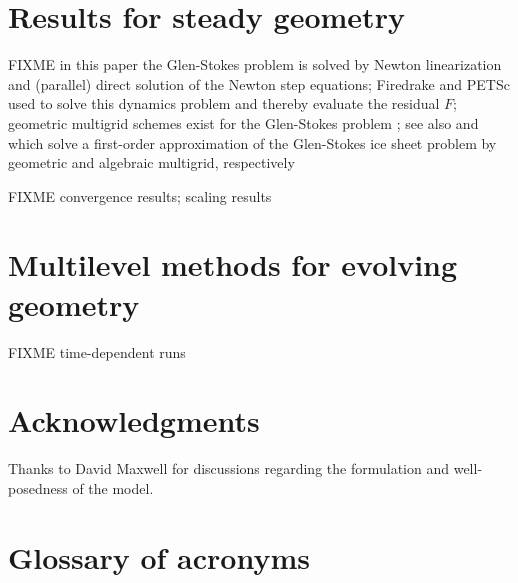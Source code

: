 \documentclass[letterpaper,final,12pt,reqno]{amsart}
\theoremstyle{claim}
\numberwithin{equation}{section}
\numberwithin{figure}{section}
\numberwithin{table}{section}
\numberwithin{theorem}{section}
\begin{document}
\section{Results for steady geometry} \label{sec:results}

FIXME in this paper the Glen-Stokes problem is solved by Newton linearization and (parallel) direct solution of the Newton step equations; Firedrake and PETSc \cite{Balayetal2020,Bueler2021} used to solve this dynamics problem and thereby evaluate the residual $F$; geometric multigrid schemes exist for the  Glen-Stokes problem \cite{IsaacStadlerGhattas2015}; see also \cite{BrownSmithAhmadia2013} and \cite{Tuminaroetal2016} which solve a first-order approximation of the Glen-Stokes ice sheet problem by geometric and algebraic multigrid, respectively

FIXME convergence results; scaling results


\section{Multilevel methods for evolving geometry} \label{sec:evolution}

FIXME time-dependent runs


\section*{Acknowledgments}  Thanks to David Maxwell for discussions regarding the formulation and well-posedness of the model.

\small

\bigskip



\appendix

\section{Glossary of acronyms} \label{app:glossary}
\end{document}
